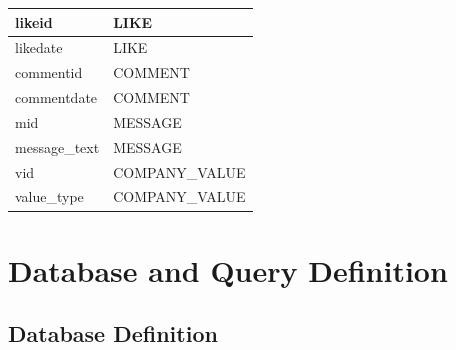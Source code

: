 \documentclass[11pt]{report}
\begin{document}
\begin{table}[h]
{\begin{tabular}{|l|l|}
likeid                                   & LIKE                                         \\ \hline
likedate                                 & LIKE                                         \\ \hline
commentid                                & COMMENT                                      \\ \hline
commentdate                              & COMMENT                                      \\ \hline
mid                                      & MESSAGE                                      \\ \hline
message\_text                            & MESSAGE                                      \\ \hline
vid                                      & COMPANY\_VALUE                               \\ \hline
value\_type                              & COMPANY\_VALUE                               \\ \hline
\end{tabular}
}
\end{table}
\clearpage

\chapter{Database and Query Definition}

\section{Database Definition}

\end{document}

